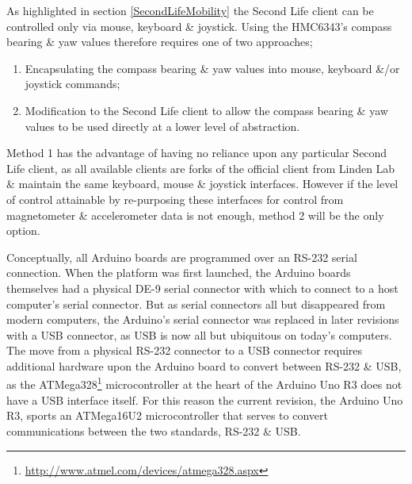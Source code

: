 \newcommand{\atmegaTFootnote}{\footnote{\url{http://www.atmel.com/devices/atmega328.aspx}}}

\newcommand{\arduinousbhidFootnote}{\footnote{\url{http://hunt.net.nz/users/darran/weblog/a3599/}}}

\newcommand{\lufaFootnote}{\footnote{\url{http://www.fourwalledcubicle.com/LUFA.php}}}


As highlighted in section \ref{SecondLifeMobility} the Second Life client can be controlled only via mouse, keyboard \& joystick. Using the HMC6343's compass bearing \& yaw values therefore requires one of two approaches;

\begin{enumerate}
	\item Encapsulating the compass bearing \& yaw values into mouse, keyboard \&/or joystick commands;
	\item Modification to the Second Life client to allow the compass bearing \& yaw values to be used directly at a lower level of abstraction.
\end{enumerate}

Method 1 has the advantage of having no reliance upon any particular Second Life client, as all available clients are forks of the official client from Linden Lab \& maintain the same keyboard, mouse \& joystick interfaces. However if the level of control attainable by re-purposing these interfaces for control from magnetometer \& accelerometer data is not enough, method 2 will be the only option.

Conceptually, all Arduino boards are programmed over an RS-232 serial connection. When the platform was first launched, the Arduino boards themselves had a physical DE-9 serial connector with which to connect to a host computer's serial connector. But as serial connectors all but disappeared from modern computers, the Arduino's serial connector was replaced in later revisions with a USB connector, as USB is now all but ubiquitous on today's computers. The move from a physical RS-232 connector to a USB connector requires additional hardware upon the Arduino board to convert between RS-232 \& USB, as the ATMega328\atmegaTFootnote{} microcontroller at the heart of the Arduino Uno R3 does not have a USB interface itself. For this reason the current revision, the Arduino Uno R3, sports an ATMega16U2\atmegaFootnote{} microcontroller that serves to convert communications between the two standards, RS-232 \& USB.

